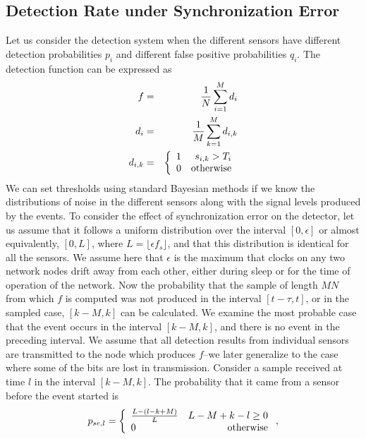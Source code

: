 \subsection{Detection Rate under Synchronization Error}
Let us consider the detection system when the different sensors have different detection probabilities $p_i$ and different false positive probabilities $q_i$. The detection function can be expressed as
\begin{eqnarray}
  f &=& {1\over N}\sum_{i=1}^Md_i \nonumber\\
  d_i &=& {1\over M}\sum_{k=1}^Md_{i,k}\label{eqn:heterog_detector}\\
  d_{i,k}&=& \left\{\begin{array}{lr}
  1 & s_{i,k}>T_i\\
  0 & {\rm otherwise}\end{array}\right.\nonumber
\end{eqnarray}
We can set thresholds using standard Bayesian methods if we know the distributions of noise in the different sensors along with the signal levels produced by the events. To consider the effect of synchronization error on the detector, let us assume that it follows a uniform distribution over the interval $[0,\epsilon]$ or almost equivalently, $[0,L]$, where $L=\lfloor \epsilon f_s\rfloor$, and that this distribution is identical for all the sensors. We assume here that $\epsilon$ is the maximum that clocks on any two network nodes drift away from each other, either during sleep or for the time of operation of the network. Now the probability that the sample of length $MN$ from which $f$ is computed was not produced in the interval $[t-\tau,t]$, or in the sampled case, $[k-M,k]$ can be calculated. We examine the most probable case that the event occurs in the interval $[k-M,k]$, and there is no event in the preceding interval. We assume that all detection results from individual sensors are transmitted to the node which produces $f$--we later generalize to the case where some of the bits are lost in transmission. Consider a sample received at time $l$ in the interval $[k-M,k]$. The probability that it came from a sensor before the event started is
\begin{equation}
  p_{se,l} = \left\{\begin{array}{lr}
  {L-(l-k+M) \over L}  & L-M+k-l\geq 0\\
  0 & {\rm otherwise}\end{array}\right.\label{eqn:syncerrorprob},
\end{equation}
